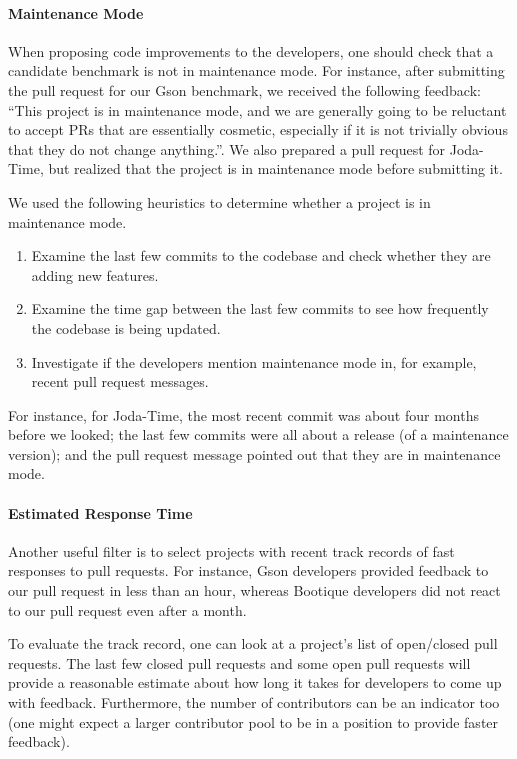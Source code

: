 \paragraph{Maintenance Mode}
When proposing code improvements to the developers, one should check that a candidate benchmark is not in maintenance mode. For instance, after submitting the pull request for our Gson benchmark, we received the following feedback: ``This project is in maintenance mode, and we are generally going to be reluctant to accept PRs that are essentially cosmetic, especially if it is not trivially obvious that they do not change anything.''. We also prepared a pull request for Joda-Time, but realized that the project is in maintenance mode before submitting it.

We used the following heuristics to determine whether a project is in maintenance mode.
\begin{enumerate}
  \item Examine the last few commits to the codebase and check whether they are adding new features.
  \item Examine the time gap between the last few commits to see how frequently the codebase is being updated.
  \item Investigate if the developers mention maintenance mode in, for example, recent pull request messages.
\end{enumerate}

For instance, for Joda-Time, the most recent commit was about four months before we looked; the last few commits were all about a release (of a maintenance version); and the pull request message pointed out that they are in maintenance mode.

\paragraph{Estimated Response Time}
Another useful filter is to select projects with recent track records of fast responses to pull requests. For instance, Gson developers provided feedback to our pull request in less than an hour, whereas Bootique developers did not react to our pull request even after a month.

To evaluate the track record, one can look at a project's list of open/closed pull requests. The last few closed pull requests and some open pull requests will provide a reasonable estimate about how long it takes for developers to come up with feedback. Furthermore, the number of contributors can be an indicator too (one might expect a larger contributor pool to be in a position to provide faster feedback).

